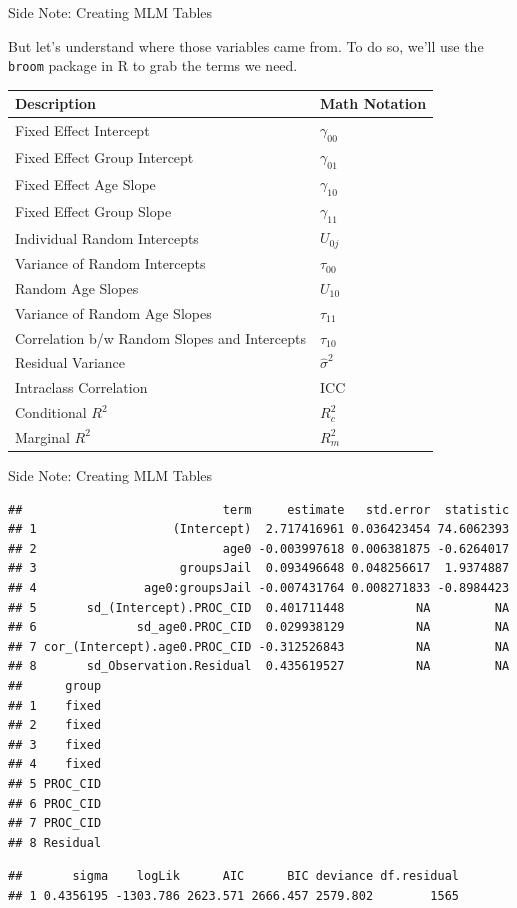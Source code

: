 \begin{frame}[fragile]{Side Note: Creating MLM Tables}

But let's understand where those variables came from. To do so, we'll
use the \texttt{broom} package in R to grab the terms we need.

\begin{longtable}[]{@{}ll@{}}
\toprule
Description & Math Notation\tabularnewline
\midrule
\endhead
Fixed Effect Intercept & \(\gamma_{00}\)\tabularnewline
Fixed Effect Group Intercept & \(\gamma_{01}\)\tabularnewline
Fixed Effect Age Slope & \(\gamma_{10}\)\tabularnewline
Fixed Effect Group Slope & \(\gamma_{11}\)\tabularnewline
Individual Random Intercepts & \(U_{0j}\)\tabularnewline
Variance of Random Intercepts & \(\tau_{00}\)\tabularnewline
Random Age Slopes & \(U_{10}\)\tabularnewline
Variance of Random Age Slopes & \(\tau_{11}\)\tabularnewline
Correlation b/w Random Slopes and Intercepts &
\(\tau_{10}\)\tabularnewline
Residual Variance & \(\hat{\sigma}^2\)\tabularnewline
Intraclass Correlation & ICC\tabularnewline
Conditional \(R^2\) & \(R^2_c\)\tabularnewline
Marginal \(R^2\) & \(R^2_m\)\tabularnewline
\bottomrule
\end{longtable}

\end{frame}

\begin{frame}[fragile]{Side Note: Creating MLM Tables}

\begin{Shaded}
\begin{Highlighting}[]
\OperatorTok{::}
\OperatorTok{::}
\end{Highlighting}
\end{Shaded}

\tiny

\begin{verbatim}
##                            term     estimate   std.error  statistic
## 1                   (Intercept)  2.717416961 0.036423454 74.6062393
## 2                          age0 -0.003997618 0.006381875 -0.6264017
## 3                    groupsJail  0.093496648 0.048256617  1.9374887
## 4               age0:groupsJail -0.007431764 0.008271833 -0.8984423
## 5       sd_(Intercept).PROC_CID  0.401711448          NA         NA
## 6              sd_age0.PROC_CID  0.029938129          NA         NA
## 7 cor_(Intercept).age0.PROC_CID -0.312526843          NA         NA
## 8       sd_Observation.Residual  0.435619527          NA         NA
##      group
## 1    fixed
## 2    fixed
## 3    fixed
## 4    fixed
## 5 PROC_CID
## 6 PROC_CID
## 7 PROC_CID
## 8 Residual
\end{verbatim}

\begin{verbatim}
##       sigma    logLik      AIC      BIC deviance df.residual
## 1 0.4356195 -1303.786 2623.571 2666.457 2579.802        1565
\end{verbatim}

\end{frame}

